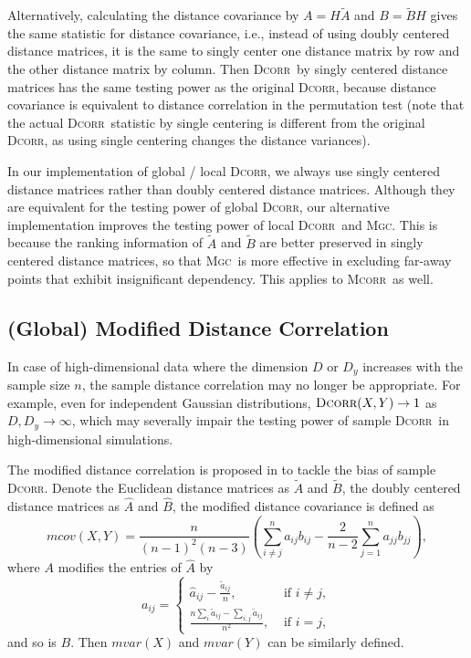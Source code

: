 \documentclass[11pt]{article}
\providecommand{\sct}[1]{{\normalfont\textsc{#1}}}
\newcommand{\Mgc}{\sct{Mgc}}
\newcommand{\Dcorr}{\sct{Dcorr}}
\newcommand{\Mcorr}{\sct{Mcorr}}
\begin{document}
Alternatively, calculating the distance covariance by $A=H\tilde{A}$ and $B=\tilde{B}H$ gives the same statistic for distance covariance, i.e., instead of using doubly centered distance matrices, it is the same to singly center one distance matrix by row and the other distance matrix by column. Then \Dcorr~by singly centered distance matrices has the same testing power as the original \Dcorr, because distance covariance is equivalent to distance correlation in the permutation test (note that the actual \Dcorr~statistic by single centering is different from the original \Dcorr, as using single centering changes the distance variances).

In our implementation of global / local \Dcorr, we always use singly centered distance matrices rather than doubly centered distance matrices. Although they are equivalent for the testing power of global \Dcorr, our alternative implementation improves the testing power of local \Dcorr~and \Mgc. This is because the ranking information of $\tilde{A}$ and $\tilde{B}$ are better preserved in singly centered distance matrices, so that \Mgc~is more effective in excluding far-away points that exhibit insignificant dependency. This applies to \Mcorr~as well.

\subsection{(Global) Modified Distance Correlation}
\label{appen:mcorr}
In case of high-dimensional data where the dimension $D$ or $D_{y}$ increases with the sample size $n$, the sample distance correlation may no longer be appropriate. For example, even for independent Gaussian distributions, $\Dcorr(X,Y) \rightarrow 1$ as $D, D_{y} \rightarrow \infty$, which may severally impair the testing power of sample \Dcorr~in high-dimensional simulations.

The modified distance correlation is proposed in \cite{SzekelyRizzo2013a} to tackle the bias of sample \Dcorr. Denote the Euclidean distance matrices as $\tilde{A}$ and $\tilde{B}$, the doubly centered distance matrices as $\hat{A}$ and $\hat{B}$, the modified distance covariance is defined as
\begin{equation*}
mcov(X,Y)=\frac{n}{(n-1)^2(n-3)}\left(\sum_{i \neq j}^{n}a_{ij}b_{ij}-\frac{2}{n-2}\sum_{j=1}^{n}a_{jj}b_{jj}\right),
\end{equation*}
where $A$ modifies the entries of $\hat{A}$ by
\[a_{ij} = \left\{
  \begin{array}{lr}
    \hat{a}_{ij}-\frac{\tilde{a}_{ij}}{n}, & \mbox{ if } i \neq j, \\
    \frac{n\sum_{i}\tilde{a}_{ij}-\sum_{i,j}\tilde{a}_{ij}}{n^2}, &\mbox{ if } i = j,
  \end{array}
\right.
\]
and so is $B$. Then $mvar(X)$ and $mvar(Y)$ can be similarly defined.
\end{document}
